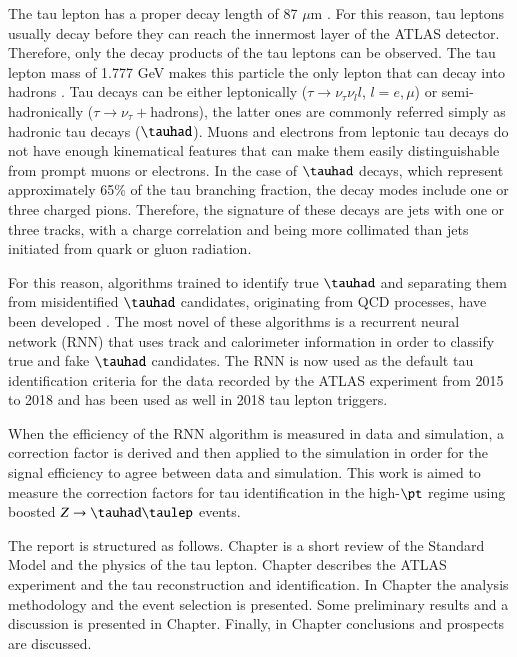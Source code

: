 The tau lepton has a proper decay length of 87 $\mu$m \cite{PhysRevD.98.030001}. For this reason, tau leptons usually decay before they can reach the innermost layer of the ATLAS detector. Therefore, only the decay products of the tau leptons can be observed. The tau lepton mass of 1.777 GeV makes this particle the only lepton that can decay into hadrons \cite{PhysRevD.98.030001}. Tau decays can be either leptonically ($\tau\to\nu_\tau\nu_l l$, $l=e,\mu$) or semi-hadronically ($\tau\to\nu_\tau+$hadrons), the latter ones are commonly referred simply as hadronic tau decays ($\tauhad$). Muons and electrons from leptonic tau decays do not have enough kinematical features that can make them easily distinguishable from prompt muons or electrons. In the case of $\tauhad$ decays, which represent approximately 65\% of the tau branching fraction, the decay modes include one or three charged pions. Therefore, the signature of these decays are jets with one or three tracks, with a charge correlation and being more collimated than jets initiated from quark or gluon radiation.

For this reason, algorithms trained to identify true $\tauhad$ and separating them from misidentified $\tauhad$  candidates, originating from QCD processes, have been developed \cite{Deutsch:2680523}. The most novel of these algorithms is a recurrent neural network (RNN) that uses track and calorimeter information in order to classify true and fake $\tauhad$ candidates. The RNN is now used as the default tau identification criteria for the data recorded by the ATLAS experiment from 2015 to 2018 and has been used as well in 2018 tau lepton triggers.

When the efficiency of the RNN algorithm is measured in data and simulation, a correction factor is derived and then applied to the simulation in order for the signal efficiency to agree between data and simulation. This work is aimed to measure the correction factors for tau identification in the high-$\pt$ regime using boosted $Z\to\tauhad\taulep$ events.

The report is structured as follows. Chapter  is a short review of the Standard Model and the physics of the tau lepton. Chapter  describes the ATLAS experiment and the tau reconstruction and identification. In Chapter  the analysis methodology and the event selection is presented. Some preliminary results and a discussion is presented in Chapter. Finally, in Chapter conclusions and prospects are discussed.
